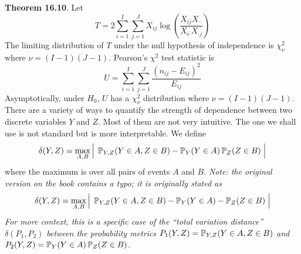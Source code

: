 \textbf{Theorem 16.10}. Let
\[
T = 2 \sum_{i=1}^I \sum_{j=1}^J X_{ij} \log \left( \frac{X_{ij} X_{\text{··}}}{X_{i\text{·}} X_{\text{·}j}} \right)
\]
The limiting distribution of \(T\) under the null hypothesis of
independence is \(\chi^{2}_\nu\) where \(\nu = (I - 1)(J - 1)\).
Pearson's \(\chi^{2}\) test statistic is
\[
U = \sum_{i=1}^I \sum_{j=1}^J \frac{(n_{ij} - E_{ij})^{2}}{E_{ij}}
\]
Asymptotically, under \(H_{0}\), \(U\) has a \(\chi^{2}_\nu\) distribution
where \(\nu = (I - 1)(J - 1)\).
There are a variety of ways to quantify the strength of dependence
between two discrete variables \(Y\) and \(Z\). Most of them are not
very intuitive. The one we shall use is not standard but is more
interpretable.
We define
\[
\delta(Y, Z) = \max_{A, B} \Big|\; \operatorname{\mathbb{P}}_{Y, Z}(Y \in A, Z \in B) - \operatorname{\mathbb{P}}_Y(Y \in A)\operatorname{\mathbb{P}}_Z(Z \in B) \;\Big|
\]
where the maximum is over all pairs of events \(A\) and \(B\).
\emph{Note: the original version on the book contains a typo; it is
originally stated as}
\[
\delta(Y, Z) = \max_{A, B} \Big|\; \operatorname{\mathbb{P}}_{Y, Z}(Y \in A, Z \in B) - \operatorname{\mathbb{P}}_Y(Y \in A) - \operatorname{\mathbb{P}}_Z(Z \in B) \;\Big|
\]
\emph{For more context, this is a specific case of the ``total variation
distance'' \(\delta(P_{1}, P_{2})\) between the probability metrics
\(P_{1}(Y, Z) = \operatorname{\mathbb{P}}_{Y, Z}(Y \in A, Z \in B)\) and
\(P_{2}(Y, Z) = \operatorname{\mathbb{P}}_Y(Y \in A)\operatorname{\mathbb{P}}_Z(Z \in B)\).}

